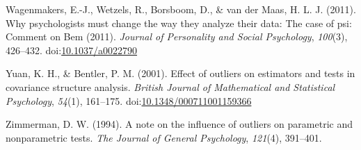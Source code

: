 \documentclass[english,,man]{apa6}
\begin{document}
\leavevmode\hypertarget{ref-Wagenmakers2011a}{}%
Wagenmakers, E.-J., Wetzels, R., Borsboom, D., \& van der Maas, H. L. J. (2011). Why psychologists must change the way they analyze their data: The case of psi: Comment on Bem (2011). \emph{Journal of Personality and Social Psychology}, \emph{100}(3), 426--432. doi:\href{https://doi.org/10.1037/a0022790}{10.1037/a0022790}

\leavevmode\hypertarget{ref-Yuan2001}{}%
Yuan, K. H., \& Bentler, P. M. (2001). Effect of outliers on estimators and tests in covariance structure analysis. \emph{British Journal of Mathematical and Statistical Psychology}, \emph{54}(1), 161--175. doi:\href{https://doi.org/10.1348/000711001159366}{10.1348/000711001159366}

\leavevmode\hypertarget{ref-Zimmerman1994}{}%
Zimmerman, D. W. (1994). A note on the influence of outliers on parametric and nonparametric tests. \emph{The Journal of General Psychology}, \emph{121}(4), 391--401.
\end{document}
